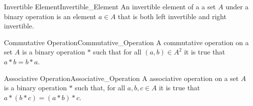     \begin{fdefinition}{Invertible Element}{Invertible_Element}
        An invertible element of a a \gls{set} $A$ under a
        \gls{binary operation} is an element $a\in{A}$ that is both
        left invertible and right invertible.
    \end{fdefinition}
    \begin{fdefinition}{Commutative Operation}{Commutative_Operation}
        A \gls{commutative operation} on a \gls{set} $A$ is a
        \gls{binary operation} $*$ such that for all $(a,b)\in{A}^{2}$ it is
        true that $a*b=b*a$.
    \end{fdefinition}
    \begin{fdefinition}{Associative Operation}{Associative_Operation}
        A \gls{associative operation} on a \gls{set} $A$ is a
        \gls{binary operation} $*$ such that, for all $a,b,c\in{A}$ it is true
        that $a*(b*c)=(a*b)*c$.
    \end{fdefinition}
